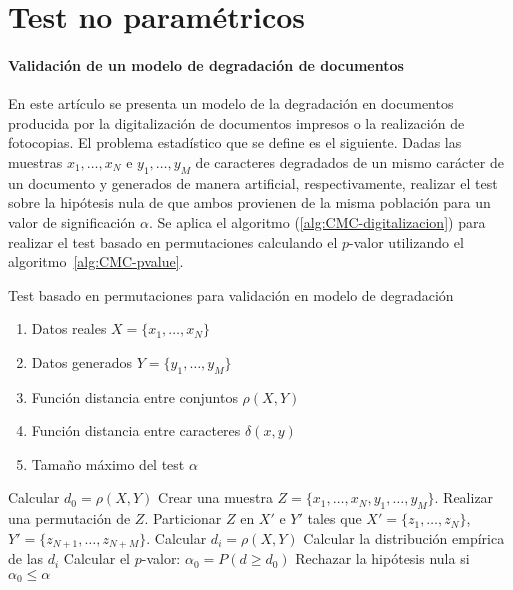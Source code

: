 	
\section{Test no paramétricos}
 
\paragraph{Validación de un modelo de degradación de 
documentos} \cite{DBLP:journals/pami/KanungoHBSM00} En este artículo se presenta un 
modelo de la degradación en documentos producida por la 
digitalización de documentos impresos o la realización de 
fotocopias. El problema estadístico que se define es el 
siguiente. Dadas las muestras $x_1, \dots, x_N$ e $y_1, 
\dots, y_M$ de caracteres degradados de un mismo carácter de 
un documento y generados de manera artificial, 
respectivamente, realizar el test sobre la hipótesis nula de 
que ambos  provienen de la misma población para un valor de 
significación $\alpha$. Se aplica el algoritmo 
(\ref{alg:CMC-digitalizacion}) para realizar el test basado 
en permutaciones calculando el $p$-valor utilizando el 
algoritmo~\ref{alg:CMC-pvalue}.

\begin{algorithm}
	\caption{Test basado en permutaciones para validación en 
			modelo de degradación}
	\label{alg:CMC-digitalizacion}
	\begin{algorithmic}[1]
	\REQUIRE
		\begin{enumerate}[a]
		\item Datos reales $X = \{ x_1, \dots, x_N \}$
		\item Datos generados $Y = \{ y_1, \dots, y_M \}$
		\item Función distancia entre conjuntos $\rho(X,Y)$
		\item Función distancia entre caracteres $\delta(x,y)$
		\item Tamaño máximo del test $\alpha$
		\end{enumerate}
		\STATE Calcular $d_0 = \rho(X,Y)$
		\STATE Crear una muestra 
			$Z= \{x_1, \dots, x_N, y_1, \dots, y_M \}$.
			\STATE Realizar una permutación de $Z$.
			\STATE Particionar $Z$ en $X'$ e $Y'$ tales que 
				$X' = \{ z_1, \dots, z_N \}$, $Y' = 
				\{ z_{N+1}, \dots, z_{N+M} \} $.
			\STATE Calcular $d_i = \rho(X,Y)$
		\ENDFOR
		\STATE Calcular la distribución empírica de las $d_i$
		\STATE Calcular el $p$-valor: 
			$\alpha_0 = P(d \geq d_0)$
		\STATE Rechazar la hipótesis nula si 
			$\alpha_0 \leq \alpha$
	\end{algorithmic}
\end{algorithm}

